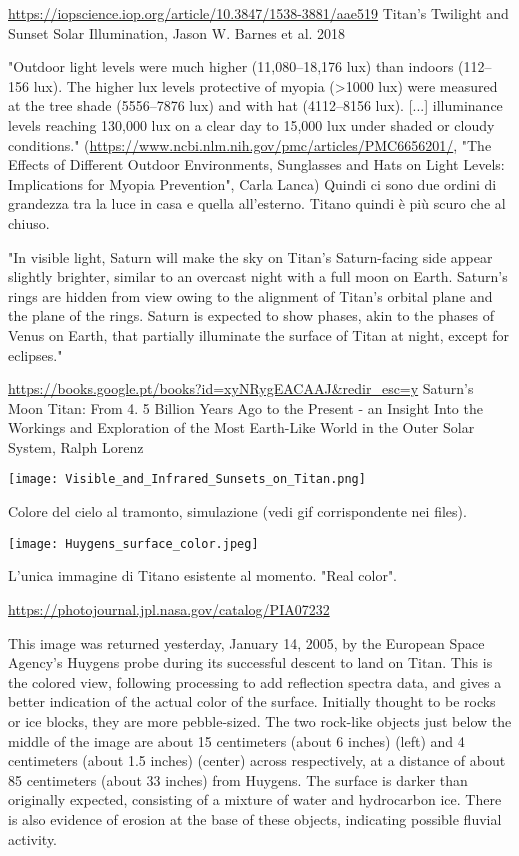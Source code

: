 \documentclass[a4paper,10pt,openany,oneside]{memoir}
\begin{document}
\url{https://iopscience.iop.org/article/10.3847/1538-3881/aae519} Titan's Twilight and Sunset Solar Illumination, Jason W. Barnes et al. 2018

"Outdoor light levels were much higher (11,080–18,176 lux) than indoors (112–156 lux). The higher lux levels protective of myopia (>1000 lux) were measured at the tree shade (5556–7876 lux) and with hat (4112–8156 lux). [...]  illuminance levels reaching 130,000 lux on a clear day to 15,000 lux under shaded or cloudy conditions." (\url{https://www.ncbi.nlm.nih.gov/pmc/articles/PMC6656201/}, "The Effects of Different Outdoor Environments, Sunglasses and Hats on Light Levels: Implications for Myopia Prevention", Carla Lanca) Quindi ci sono due ordini di grandezza tra la luce in casa e quella all'esterno. Titano quindi è più scuro che al chiuso.


"In visible light, Saturn will make the sky on Titan's Saturn-facing side appear slightly brighter, similar to an overcast night with a full moon on Earth. Saturn's rings are hidden from view owing to the alignment of Titan's orbital plane and the plane of the rings. Saturn is expected to show phases, akin to the phases of Venus on Earth, that partially illuminate the surface of Titan at night, except for eclipses."

\url{https://books.google.pt/books?id=xyNRygEACAAJ&redir_esc=y} Saturn's Moon Titan: From 4. 5 Billion Years Ago to the Present - an Insight Into the Workings and Exploration of the Most Earth-Like World in the Outer Solar System, Ralph Lorenz


\texttt{[image: Visible\_and\_Infrared\_Sunsets\_on\_Titan.png]}

Colore del cielo al tramonto, simulazione (vedi gif corrispondente nei files).


\texttt{[image: Huygens\_surface\_color.jpeg]}

L'unica immagine di Titano esistente al momento. "Real color".

\url{https://photojournal.jpl.nasa.gov/catalog/PIA07232}

This image was returned yesterday, January 14, 2005, by the European Space Agency's Huygens probe during its successful descent to land on Titan. This is the colored view, following processing to add reflection spectra data, and gives a better indication of the actual color of the surface. Initially thought to be rocks or ice blocks, they are more pebble-sized. The two rock-like objects just below the middle of the image are about 15 centimeters (about 6 inches) (left) and 4 centimeters (about 1.5 inches) (center) across respectively, at a distance of about 85 centimeters (about 33 inches) from Huygens. The surface is darker than originally expected, consisting of a mixture of water and hydrocarbon ice. There is also evidence of erosion at the base of these objects, indicating possible fluvial activity.
\end{document}
